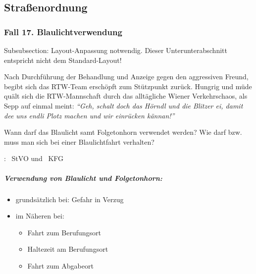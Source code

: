 

\subsection{Stra{\ss}enordnung}

\subsubsection{Fall 17. Blaulichtverwendung}
\begin{anfxwarning}[author=GABS]{Subsubsection: Layout-Anpassung notwendig.}
Dieser Unterunterabschnitt entspricht nicht dem Standard-Layout!
\end{anfxwarning}


Nach Durchf\"uhrung der Behandlung und Anzeige gegen den aggressiven
Freund, begibt sich das RTW-Team ersch\"opft zum St\"utzpunkt zur\"uck.
Hungrig und m\"ude quält sich die RTW-Mannschaft durch das
alltägliche Wiener Verkehrschaos, als Sepp auf einmal meint:
\emph{"`Geh, schalt doch das H\"orndl und die Blitzer ei,
damit dee uns endli Plotz machen und wir einr\"ucken
kännan!"'}


Wann darf das Blaulicht samt Folgetonhorn verwendet werden? Wie darf
bzw. muss man sich bei einer Blaulichtfahrt verhalten?


: ~StVO und ~KFG

\subparagraph{Verwendung von Blaulicht und Folgetonhorn:}

\begin{itemize}
    \item grundsätzlich bei: Gefahr in Verzug
    \item im Näheren bei:
    \begin{itemize}
        \item Fahrt zum Berufungsort
        \item Haltezeit am Berufungsort
        \item Fahrt zum Abgabeort
    \end{itemize}
\end{itemize}

